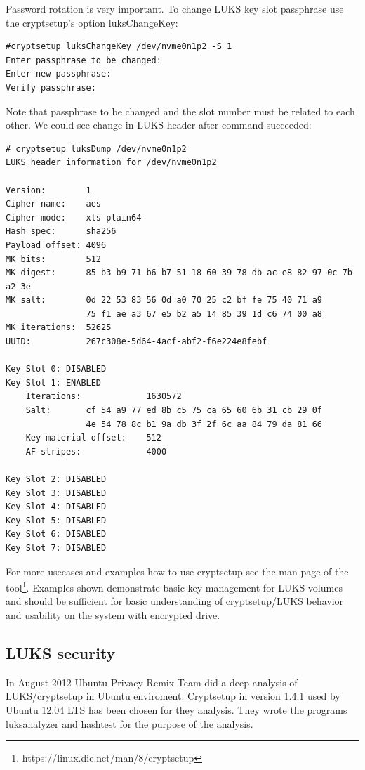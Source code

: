 Password rotation is very important.
To change LUKS key slot passphrase use the cryptsetup's option luksChangeKey:
\begin{lstlisting}[columns=fixed,basicstyle=\ttfamily\footnotesize,tabsize=4,backgroundcolor=\color{yellow!10}]
#cryptsetup luksChangeKey /dev/nvme0n1p2 -S 1
Enter passphrase to be changed:
Enter new passphrase:
Verify passphrase:
\end{lstlisting}
Note that passphrase to be changed and the slot number must be related to each other.
We could see change in LUKS header after command succeeded:
\begin{lstlisting}[columns=fixed,basicstyle=\ttfamily\footnotesize,tabsize=4,backgroundcolor=\color{yellow!10}]
# cryptsetup luksDump /dev/nvme0n1p2
LUKS header information for /dev/nvme0n1p2

Version:		1
Cipher name:	aes
Cipher mode:	xts-plain64
Hash spec:		sha256
Payload offset:	4096
MK bits:		512
MK digest:		85 b3 b9 71 b6 b7 51 18 60 39 78 db ac e8 82 97 0c 7b a2 3e
MK salt:		0d 22 53 83 56 0d a0 70 25 c2 bf fe 75 40 71 a9
				75 f1 ae a3 67 e5 b2 a5 14 85 39 1d c6 74 00 a8
MK iterations: 	52625
UUID:			267c308e-5d64-4acf-abf2-f6e224e8febf

Key Slot 0: DISABLED
Key Slot 1: ENABLED
	Iterations:				1630572
	Salt:		cf 54 a9 77 ed 8b c5 75 ca 65 60 6b 31 cb 29 0f
				4e 54 78 8c b1 9a db 3f 2f 6c aa 84 79 da 81 66
	Key material offset:	512
	AF stripes:				4000

Key Slot 2: DISABLED
Key Slot 3: DISABLED
Key Slot 4: DISABLED
Key Slot 5: DISABLED
Key Slot 6: DISABLED
Key Slot 7: DISABLED
\end{lstlisting}
For more usecases and examples how to use cryptsetup see the man page of the tool\footnote{https://linux.die.net/man/8/cryptsetup}.
Examples shown demonstrate basic key management for LUKS volumes and should be sufficient for basic understanding of cryptsetup/LUKS behavior and usability on the system with encrypted drive.



\subsection{LUKS security}

In August 2012 Ubuntu Privacy Remix Team did a deep analysis of LUKS/cryptsetup in Ubuntu enviroment.
Cryptsetup in version 1.4.1 used by Ubuntu 12.04 LTS has been chosen for they analysis.
They wrote the programs luksanalyzer and hashtest for the purpose of the analysis.

